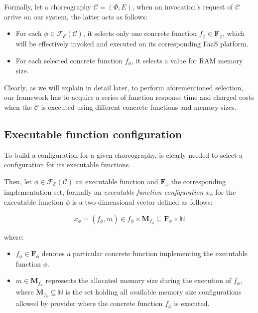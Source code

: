 \documentclass[12pt,a4paper]{report}
\newcommand{\N}{\mathbb{N}}
\begin{document}
Formally, let a choreography $\mathcal{C} = (\Phi,E)$, when an invocation's request of $\mathcal{C}$ arrive on our system, the latter acts as follows:

\begin{itemize}
	\item For each $\phi \in \mathscr{F_E}(\mathcal{C})$, it selects only one concrete function $f_{\phi} \in \textbf{F}_{\phi}$, which will be effectively invoked and executed on its corresponding FaaS platform. 
	\item For each selected concrete function $f_{\phi}$, it selects a value for RAM memory size.
\end{itemize}

Clearly, as we will explain in detail later, to perform aforementioned selection, our framework has to acquire a series of function response time and charged costs when the $\mathcal{C}$ is executed using different concrete functions and memory sizes.  

\subsection{Executable function configuration}

To build a configuration for a given choreography, is clearly needed to select a configuration for its executable functions. 

Then, let $\phi \in \mathscr{F_E}(\mathcal{C})$ an executable function and $\textbf{F}_{\phi}$ the corresponding implementation-set, formally an \textit{executable function configuration} $x_{\phi}$ for the executable function $\phi$ is a two-dimensional vector defined as follows:

\begin{equation}
	x_{\phi} = (f_{\phi},m) \in f_{\phi} \times \textbf{M}_{f_{\phi}} \subseteq \textbf{F}_{\phi} \times \N
\end{equation}

where:

\begin{itemize}
	\item $f_{\phi} \in \textbf{F}_{\phi}$  denotes a particular concrete function implementing the executable function $\phi$.
	\item $m \in \textbf{M}_{f_{\phi}}$ represents the allocated memory size during the execution of $f_{\phi}$, where $\textbf{M}_{f_{\phi}} \subseteq \N$ is the set holding all available memory size configurations allowed by provider where the concrete function $f_{\phi}$ is executed.
\end{itemize}
\end{document}
